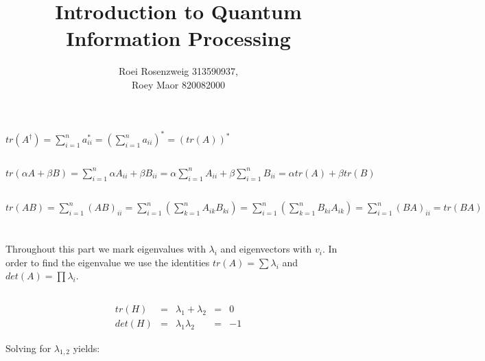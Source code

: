 \documentclass[a4paper,10pt]{hw}
\title{Introduction to Quantum Information Processing}
\author{Roei Rosenzweig 313590937,\\ Roey Maor 820082000}
\begin{document}
\maketitle

\section{}

\subsection{}

$tr(A^{\dagger}) = \sum_{i=1}^{n}{a_{ii}^*} = (\sum_{i=1}^{n}{a_{ii}})^* = (tr(A))^*$

\subsection{}

$tr(\alpha A + \beta B) = \sum_{i=1}^{n}{\alpha A_{ii} + \beta B_{ii}} = \alpha\sum_{i=1}^{n}{A_{ii}} + \beta\sum_{i=1}^{n}{B_{ii}} = \alpha tr(A) + \beta tr(B)$

\subsection{}

$tr(AB) = \sum_{i=1}^{n}{(AB)_{ii}} = \sum_{i=1}^{n}{(\sum_{k=1}^{n}{A_{ik} B_{ki}})} = \sum_{i=1}^{n}{(\sum_{k=1}^{n}{B_{ki} A_{ik}})} = \sum_{i=1}^{n}{(BA)_{ii}} = tr(BA)$ 

\section{}

Throughout this part we mark eigenvalues with $\lambda_i$ and eigenvectors with $v_i$.
In order to find the eigenvalue we use the identities $tr(A) = \sum{\lambda_i}$ and $det(A) = \prod{\lambda_i}$.

\subsection{}

$$\begin{array}{lclcl}
   tr(H) & = & \lambda_{1} + \lambda_{2} & = & 0\\
   det(H) & = & \lambda_{1} \lambda_{2} & = & -1
\end{array}$$

Solving for $\lambda_{1,2}$ yields:
\end{document}
